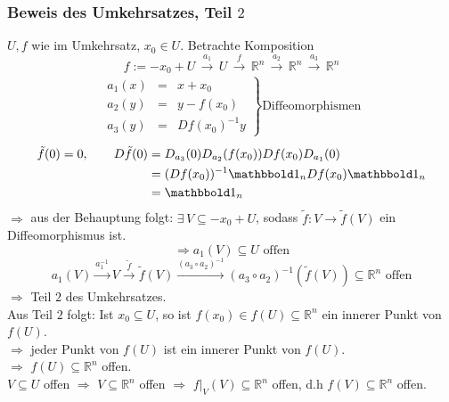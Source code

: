 \subsubsection{Beweis des Umkehrsatzes, Teil $2$} %
\label{ssub:beweis_des_umkehrsatzes_teil_2}
$U,f$ wie im Umkehrsatz, $x_0 \in U$. Betrachte Komposition
\[
	f:= -x_0+U \, \xrightarrow{a_1}\, U \, \xrightarrow{f} \, \mathbb{R}^n \, \xrightarrow{a_2} \, \mathbb{R}^n \, \xrightarrow{a_3} \, \mathbb{R}^n
\]
\begin{align*}
	\left. \begin{array}{rcl}
		a_1(x) & = & x+x_0 \\
		a_2(y) & = & y - f(x_0) \\
		a_3(y) & = & Df(x_0)^{-1}y
	\end{array} \right\} \text{Diffeomorphismen}
\end{align*}
\begin{align*}
	\tilde f(0)=0, \qquad D \tilde f(0) &= D_{a_3}(0)D_{a_2}(f(x_0))Df(x_0)D_{a_1}(0) \\
	&= (Df(x_0))^{-1} \ind_n Df(x_0) \ind_n  \\
	&= \ind_n
\end{align*}
$\Rightarrow$ aus der Behauptung folgt: $\exists\,V \subseteq -x_0+U$, sodass $ \tilde f: V \to \tilde f(V)$ ein Diffeomorphismus ist. \\
\[
	\Rightarrow a_1(V) \subseteq U \text{ offen}
\]
\[
	a_1(V) \xrightarrow{a_1^{-1}} V \xrightarrow{\tilde f} \tilde f(V) \xrightarrow{(a_3 \circ a_2)^{-1}} (a_3 \circ a_2)^{-1}( \tilde f(V)) \subseteq \mathbb{R}^n \text{ offen}
\]
$\Rightarrow$ Teil $2$ des Umkehrsatzes. \\
Aus Teil $2$ folgt: Ist $x_0 \subseteq U$, so ist $f(x_0) \in f(U) \subseteq \mathbb{R}^n$ ein innerer Punkt von $f(U)$. \\
$\Rightarrow$ jeder Punkt von $f(U)$ ist ein innerer Punkt von $f(U)$. \\
$\Rightarrow$ $f(U) \subseteq \mathbb{R}^n$ offen. \\
$V \subseteq U$ offen $\Rightarrow$ $V \subseteq \mathbb{R}^n$ offen $\Rightarrow$ $f  \big|_{V}^{}(V) \subseteq \mathbb{R}^n$ offen, d.h $f(V) \subseteq \mathbb{R}^n$ offen. \bewende
\hphantom{k}
\hphantom{k}
